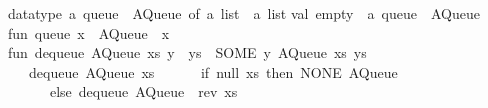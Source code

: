\begin{isabellebody}
\begin{isamarkuptext}
\isanewline
datatype\ {}a\ queue\ {}\ AQueue\ of\ {}a\ list\ {}\ {}a\ list{}\isanewline
\isanewline
val\ empty\ {}\ {}a\ queue\ {}\ AQueue\ {}{}{}{}\ {}{}{}{}\isanewline
\isanewline
fun\ queue\ x\ {}\ AQueue\ {}{}{}{}\ x{}{}\isanewline
\isanewline
fun\ dequeue\ {}AQueue\ {}xs{}\ y\ {}{}\ ys{}{}\ {}\ {}SOME\ y{}\ AQueue\ {}xs{}\ ys{}{}\isanewline
\ \ {}\ dequeue\ {}AQueue\ {}xs{}\ {}{}{}{}\ {}\isanewline
\ \ \ \ {}if\ null\ xs\ then\ {}NONE{}\ AQueue\ {}{}{}{}\ {}{}{}{}\isanewline
\ \ \ \ \ \ else\ dequeue\ {}AQueue\ {}{}{}{}\ rev\ xs{}{}{}{}\isanewline

\end{isamarkuptext}
\end{isabellebody}
